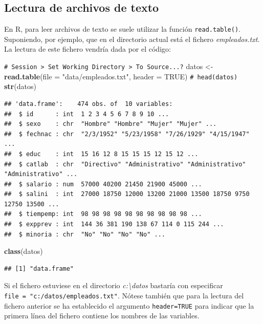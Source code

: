 \documentclass[
]{book}
\newenvironment{Shaded}{\begin{snugshade}}{\end{snugshade}}
\newcommand{\AttributeTok}[1]{\textcolor[rgb]{0.13,0.29,0.53}{#1}}
\newcommand{\CommentTok}[1]{\textcolor[rgb]{0.56,0.35,0.01}{\textit{#1}}}
\newcommand{\ConstantTok}[1]{\textcolor[rgb]{0.56,0.35,0.01}{#1}}
\newcommand{\FunctionTok}[1]{\textcolor[rgb]{0.13,0.29,0.53}{\textbf{#1}}}
\newcommand{\NormalTok}[1]{#1}
\newcommand{\OtherTok}[1]{\textcolor[rgb]{0.56,0.35,0.01}{#1}}
\newcommand{\StringTok}[1]{\textcolor[rgb]{0.31,0.60,0.02}{#1}}
\theoremstyle{break}
\theoremstyle{nonumberplain}
\renewcommand{\CommentTok}[1]{\textcolor[rgb]{0.41,0.41,0.41}{\texttt{#1}}}
\begin{document}
\subsection{Lectura de archivos de texto}\label{cap2-texto}

En R, para leer archivos de texto se suele utilizar la función \texttt{read.table()}.
Suponiendo, por ejemplo, que en el directorio actual está el fichero
\emph{empleados.txt}. La lectura de este fichero vendría dada por el código:

\begin{Shaded}
\begin{Highlighting}[]
\CommentTok{\# Session \textgreater{} Set Working Directory \textgreater{} To Source...?}
\NormalTok{datos }\OtherTok{\textless{}{-}} \FunctionTok{read.table}\NormalTok{(}\AttributeTok{file =} \StringTok{"data/empleados.txt"}\NormalTok{, }\AttributeTok{header =} \ConstantTok{TRUE}\NormalTok{)}
\CommentTok{\# head(datos)}
\FunctionTok{str}\NormalTok{(datos)}
\end{Highlighting}
\end{Shaded}

\begin{verbatim}
## 'data.frame':    474 obs. of  10 variables:
##  $ id      : int  1 2 3 4 5 6 7 8 9 10 ...
##  $ sexo    : chr  "Hombre" "Hombre" "Mujer" "Mujer" ...
##  $ fechnac : chr  "2/3/1952" "5/23/1958" "7/26/1929" "4/15/1947" ...
##  $ educ    : int  15 16 12 8 15 15 15 12 15 12 ...
##  $ catlab  : chr  "Directivo" "Administrativo" "Administrativo" "Administrativo" ...
##  $ salario : num  57000 40200 21450 21900 45000 ...
##  $ salini  : int  27000 18750 12000 13200 21000 13500 18750 9750 12750 13500 ...
##  $ tiempemp: int  98 98 98 98 98 98 98 98 98 98 ...
##  $ expprev : int  144 36 381 190 138 67 114 0 115 244 ...
##  $ minoria : chr  "No" "No" "No" "No" ...
\end{verbatim}

\begin{Shaded}
\begin{Highlighting}[]
\FunctionTok{class}\NormalTok{(datos)}
\end{Highlighting}
\end{Shaded}

\begin{verbatim}
## [1] "data.frame"
\end{verbatim}

Si el fichero estuviese en el directorio \emph{c:\textbackslash datos} bastaría con especificar
\texttt{file\ =\ "c:/datos/empleados.txt"}.
Nótese también que para la lectura del fichero anterior se ha
establecido el argumento \texttt{header=TRUE} para indicar que la primera línea del
fichero contiene los nombres de las variables.
\end{document}
